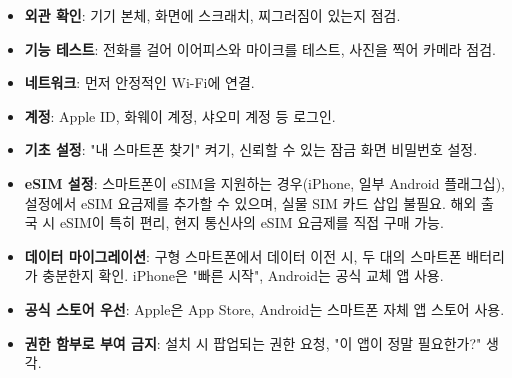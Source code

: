 

\begin{itemize}
  \item \textbf{외관 확인}: 기기 본체, 화면에 스크래치, 찌그러짐이 있는지 점검.
  \item \textbf{기능 테스트}: 전화를 걸어 이어피스와 마이크를 테스트, 사진을 찍어 카메라 점검.
\end{itemize}


\begin{itemize}
  \item \textbf{네트워크}: 먼저 안정적인 Wi-Fi에 연결.
  \item \textbf{계정}: Apple ID, 화웨이 계정, 샤오미 계정 등 로그인.
  \item \textbf{기초 설정}: "내 스마트폰 찾기" 켜기, 신뢰할 수 있는 잠금 화면 비밀번호 설정.
  \item \textbf{eSIM 설정}: 스마트폰이 eSIM을 지원하는 경우(iPhone, 일부 Android 플래그십), 설정에서 eSIM 요금제를 추가할 수 있으며, 실물 SIM 카드 삽입 불필요. 해외 출국 시 eSIM이 특히 편리, 현지 통신사의 eSIM 요금제를 직접 구매 가능.
  \item \textbf{데이터 마이그레이션}: 구형 스마트폰에서 데이터 이전 시, 두 대의 스마트폰 배터리가 충분한지 확인. iPhone은 "빠른 시작", Android는 공식 교체 앱 사용.
\end{itemize}


\begin{itemize}
  \item \textbf{공식 스토어 우선}: Apple은 App Store, Android는 스마트폰 자체 앱 스토어 사용.
  \item \textbf{권한 함부로 부여 금지}: 설치 시 팝업되는 권한 요청, "이 앱이 정말 필요한가?" 생각.
\end{itemize}
